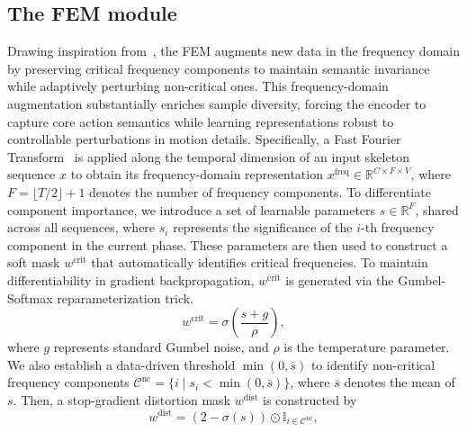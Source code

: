 \documentclass[journal]{IEEEtran}
\begin{document}
\subsection{The FEM module}
Drawing inspiration from~\cite{tian2025}, the FEM augments new data in the frequency domain by preserving critical frequency components to maintain semantic invariance while adaptively perturbing non-critical ones. 
This frequency-domain augmentation substantially enriches sample diversity, forcing the encoder to capture core action semantics while learning representations robust to controllable perturbations in motion details. 
Specifically, a Fast Fourier Transform~\cite{Brigham1967fft} is applied along the temporal dimension of an input skeleton sequence $x$ to obtain its frequency-domain representation $x^{\text{freq}} \in \mathbb{R}^{C \times F \times V}$, where $F=\lfloor T/2 \rfloor + 1$ denotes the number of frequency components.
To differentiate component importance, we introduce a set of learnable parameters $s \in \mathbb{R}^F$, shared across all sequences, where $s_i$ represents the significance of the $i$-th frequency component in the current phase.
These parameters are then used to construct a soft mask $w^{\text{crit}}$ that automatically identifies critical frequencies.
To maintain differentiability in gradient backpropagation, $w^{\text{crit}}$ is generated via the Gumbel-Softmax reparameterization trick.
\begin{equation}
    w^{\text{crit}} = \sigma\left(\frac{s+g}{\rho}\right),
\end{equation}
where $g$ represents standard Gumbel noise, and $\rho$ is the temperature parameter. 
We also establish a data-driven threshold $\min(0, \bar{s})$ to identify non-critical frequency components $\mathcal{C}^{\text{nc}} = \{i \mid s_i < \min(0, \bar{s})\}$, where $\bar{s}$ denotes the mean of $s$. 
Then, a stop-gradient distortion mask $w^{\text{dist}}$ is constructed by
\begin{equation}
    w^{\text{dist}} = (2 - \sigma(s)) \odot \mathbb{I}_{i \in \mathcal{C}^{\text{nc}}},
\end{equation}
\end{document}
